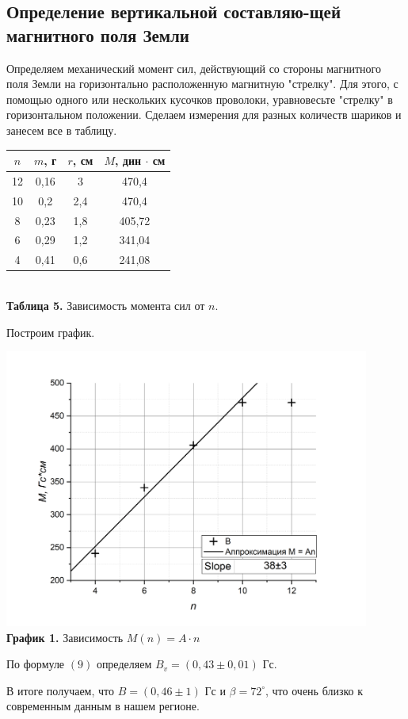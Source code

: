 \documentclass[a4paper, 12pt]{article}%
\begin{document}
\subsection*{Определение вертикальной составляю-щей магнитного поля Земли}
Определяем механический момент сил, действующий со стороны магнитного поля Земли на горизонтально расположенную магнитную "стрелку". Для этого, с помощью одного или нескольких кусочков проволоки, уравновесьте "стрелку" в горизонтальном положении. Сделаем измерения для разных количеств шариков и занесем все в таблицу.
\begin{center}
\begin{tabular}{|c|c|c|c|}
\hline
$n$ & $m$, г & $r$, см & $M$, дин $\cdot$ см \\ \hline
12 & 0,16 & 3 & 470,4 \\ \hline
10 & 0,2 & 2,4 & 470,4 \\ \hline
8 & 0,23 & 1,8 & 405,72 \\ \hline
6 & 0,29 & 1,2 & 341,04 \\ \hline
4 & 0,41 & 0,6 & 241,08 \\ \hline
\end{tabular}\\
\textbf{Таблица 5.} Зависимость момента сил от $n$.
\end{center}
Построим график. 
\begin{center}
\includegraphics[width = 0.9\textwidth]{3.jpg}\\
\textbf{График 1. } Зависимость $M(n) = A \cdot n$
\end{center}
По формуле $(9)$ определяем $B_v = (0,43 \pm 0,01)$ Гс.

В итоге получаем, что $B = (0,46 \pm 1)$ Гс и $\beta = 72^{\circ}$, что очень близко к современным данным в нашем регионе.
\end{document}
